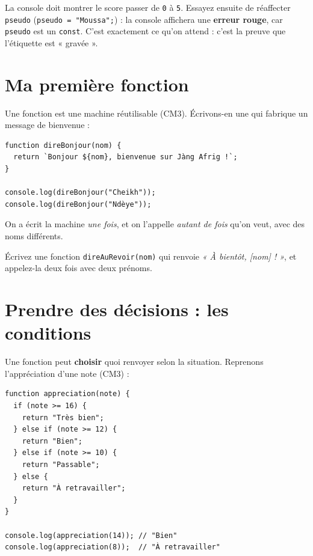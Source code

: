 \documentclass[11pt,a4paper]{article}
\newcommand{\code}[1]{\texttt{#1}}
\begin{document}
\begin{infobox}[Vérification]
La console doit montrer le score passer de \code{0} à \code{5}. Essayez ensuite de réaffecter \code{pseudo} (\code{pseudo = "Moussa";}) : la console affichera une \textbf{erreur rouge}, car \code{pseudo} est un \code{const}. C'est exactement ce qu'on attend : c'est la preuve que l'étiquette est « gravée ».
\end{infobox}

\section{Ma première fonction}

Une fonction est une machine réutilisable (CM3). Écrivons-en une qui fabrique un message de bienvenue :

\begin{lstlisting}[style=js]
function direBonjour(nom) {
  return `Bonjour ${nom}, bienvenue sur Jàng Afrig !`;
}

console.log(direBonjour("Cheikh"));
console.log(direBonjour("Ndèye"));
\end{lstlisting}

On a écrit la machine \emph{une fois}, et on l'appelle \emph{autant de fois} qu'on veut, avec des noms différents.

\begin{objectifbox}
Écrivez une fonction \code{direAuRevoir(nom)} qui renvoie \emph{« À bientôt, [nom] ! »}, et appelez-la deux fois avec deux prénoms.
\end{objectifbox}

\section{Prendre des décisions : les conditions}

Une fonction peut \textbf{choisir} quoi renvoyer selon la situation. Reprenons l'appréciation d'une note (CM3) :

\begin{lstlisting}[style=js]
function appreciation(note) {
  if (note >= 16) {
    return "Très bien";
  } else if (note >= 12) {
    return "Bien";
  } else if (note >= 10) {
    return "Passable";
  } else {
    return "À retravailler";
  }
}

console.log(appreciation(14)); // "Bien"
console.log(appreciation(8));  // "À retravailler"
\end{lstlisting}
\end{document}
